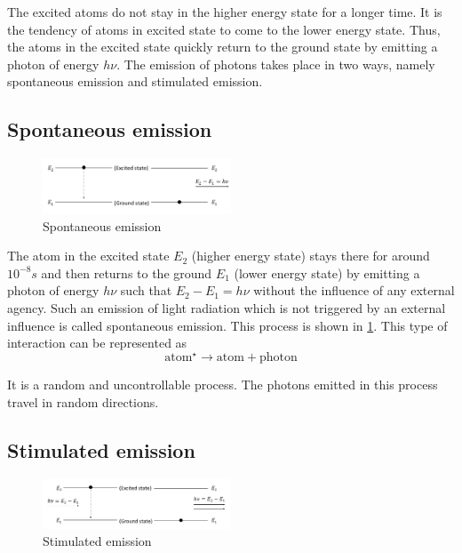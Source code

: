 \documentclass[12pt]{article}
\begin{document}
The excited atoms do not stay in the higher energy state for a longer time. It is the tendency of atoms in excited state to come to the lower energy state. Thus, the atoms in the excited state quickly return to the ground state by emitting a photon of energy \(h\nu\). The emission of photons takes place in two ways, namely spontaneous emission and stimulated emission.

\subsection{Spontaneous emission}
\label{subsec: Spontaneous emission}
\begin{figure}[h]
    \centering
    \includegraphics[width=0.5\textwidth]{spoemi}
    \caption{Spontaneous emission}
    \label{spoemi}
\end{figure}

The atom in the excited state \(E_2\) (higher energy state) stays there for around \(10^{-8}s\) and then returns to the ground \(E_1\) (lower energy state) by emitting a photon of energy \(h\nu\) such that \(E_2-E_1=h\nu\) without the influence of any external agency. Such an emission of light radiation which is not triggered by an external influence is called spontaneous emission. This process is shown in \ref{spoemi}. This type of interaction can be represented as
\[\text{atom}^{\star} \rightarrow \text{atom} + \text{photon}\]

It is a random and uncontrollable process. The photons emitted in this process travel in random directions.

\subsection{Stimulated emission}
\begin{figure}[h]
    \centering
    \includegraphics[width=0.5\textwidth]{stiemi}
    \caption{Stimulated emission}
    \label{stiemi}
\end{figure}
\end{document}
